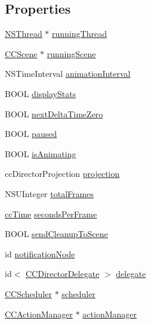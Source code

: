 \subsection*{Properties}
\begin{DoxyCompactItemize}
\item 
\hyperlink{class_n_s_thread}{N\-S\-Thread} $\ast$ \hyperlink{class_c_c_director_a423547bc44156f088a2a6a06802584fd}{running\-Thread}
\item 
\hyperlink{interface_c_c_scene}{C\-C\-Scene} $\ast$ \hyperlink{class_c_c_director_a3e4f16a4ebd7addb1cb666bdc9537c17}{running\-Scene}
\item 
N\-S\-Time\-Interval \hyperlink{class_c_c_director_a5931f953b43d501fe234fbdcadd312da}{animation\-Interval}
\item 
B\-O\-O\-L \hyperlink{class_c_c_director_a750f72a036194b76db50c572686020ea}{display\-Stats}
\item 
B\-O\-O\-L \hyperlink{class_c_c_director_aef654b999ea5eab251222c340a12df24}{next\-Delta\-Time\-Zero}
\item 
B\-O\-O\-L \hyperlink{class_c_c_director_ab429550cc193f7f0a5bbc1e0493acc69}{paused}
\item 
B\-O\-O\-L \hyperlink{class_c_c_director_adf3e09b6bf13f28b6ca52cdec4c4643b}{is\-Animating}
\item 
cc\-Director\-Projection \hyperlink{class_c_c_director_ac46efb3879931d41918b30e68e904d32}{projection}
\item 
N\-S\-U\-Integer \hyperlink{class_c_c_director_aec2768ee5ab8900069df6ede35f2fe91}{total\-Frames}
\item 
\hyperlink{cc_types_8h_ae6c674aac4bfb46a4e6cb1e89bb66b4f}{cc\-Time} \hyperlink{class_c_c_director_a751c1b06838dcfb33fda37c4d93168da}{seconds\-Per\-Frame}
\item 
B\-O\-O\-L \hyperlink{class_c_c_director_a767522c54be75808c90a4ef23b4a56e9}{send\-Cleanup\-To\-Scene}
\item 
id \hyperlink{class_c_c_director_a073ee609bdbd2b99ea70e5881cebfdac}{notification\-Node}
\item 
id$<$ \hyperlink{protocol_c_c_director_delegate-p}{C\-C\-Director\-Delegate} $>$ \hyperlink{class_c_c_director_a0b46357f83bf6ce9143b0ad4f2aa4a42}{delegate}
\item 
\hyperlink{class_c_c_scheduler}{C\-C\-Scheduler} $\ast$ \hyperlink{class_c_c_director_a2a779aef7ff84b29fbec784844d6eed3}{scheduler}
\item 
\hyperlink{interface_c_c_action_manager}{C\-C\-Action\-Manager} $\ast$ \hyperlink{class_c_c_director_a8cd504d7743a5ea6c9f93e3851215bee}{action\-Manager}
\end{DoxyCompactItemize}


